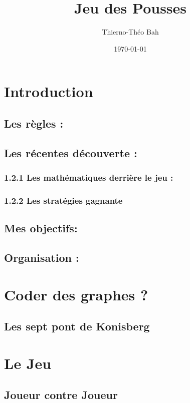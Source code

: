 \documentclass[12pt,a4paper]{memoir} %
\title{Jeu des Pousses}
\author{Thierno-Théo Bah}
\date{\today} %
\begin{document}
\maketitle
\newpage
\tableofcontents* %


\chapter{Introduction}

\section{Les règles :}

\section{Les récentes découverte :}
\subsection{1.2.1	Les mathématiques derrière le jeu :}
\subsection{1.2.2	Les stratégies gagnante}

\section{Mes objectifs:}

\section{Organisation :}

\chapter{Coder des graphes ?}
\section{Les sept pont de Konisberg}


\chapter{Le Jeu}


\section{Joueur contre Joueur}
\end{document}
